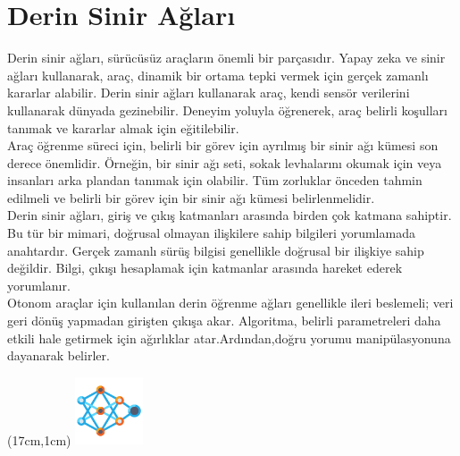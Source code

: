 \documentclass{article}
\begin{document}
\section{Derin Sinir Ağları}
Derin sinir ağları, sürücüsüz araçların önemli bir parçasıdır. Yapay zeka ve sinir ağları kullanarak, araç, dinamik bir ortama tepki vermek için gerçek zamanlı kararlar alabilir. Derin sinir ağları kullanarak araç, kendi sensör verilerini kullanarak dünyada gezinebilir. Deneyim yoluyla öğrenerek, araç belirli koşulları tanımak ve kararlar almak için eğitilebilir.\\[5pt]
Araç öğrenme süreci için, belirli bir görev için ayrılmış bir sinir ağı kümesi son derece önemlidir. Örneğin, bir sinir ağı seti, sokak levhalarını okumak için veya insanları arka plandan tanımak için olabilir. Tüm zorluklar önceden tahmin edilmeli ve belirli bir görev için bir sinir ağı kümesi belirlenmelidir.\\[5pt]
Derin sinir ağları, giriş ve çıkış katmanları arasında birden çok katmana sahiptir. Bu tür bir mimari, doğrusal olmayan ilişkilere sahip bilgileri yorumlamada anahtardır. Gerçek zamanlı sürüş bilgisi genellikle doğrusal bir ilişkiye sahip değildir. Bilgi, çıkışı hesaplamak için katmanlar arasında hareket ederek yorumlanır.\\[4pt]
Otonom araçlar için kullanılan derin öğrenme ağları genellikle ileri beslemeli; veri geri dönüş yapmadan girişten çıkışa akar. Algoritma, belirli parametreleri daha etkili hale getirmek için ağırlıklar atar.Ardından,doğru yorumu manipülasyonuna dayanarak belirler.

\begin{textblock*}{5cm}(17cm,1cm) %
    \includegraphics[width=2cm]{image/sinir.png} %
\end{textblock*}
\end{document}

